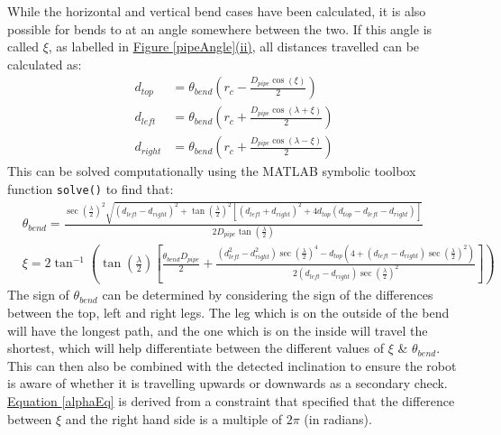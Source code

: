 \documentclass[11pt]{article}		%
\begin{document}
		While the horizontal and vertical bend cases have been calculated, it is also possible for bends to at an angle somewhere between the two.
		If this angle is called $\xi$, as labelled in \hyperref[pipeAngle]{Figure \ref*{pipeAngle}(ii)}, all distances travelled can be calculated as:
		\begin{align}
			d_{top} &= \theta_{bend} \left( r_c - \frac{D_{pipe} \cos \left( \xi \right)}{2} \right) \label{d_top}
			\\
			d_{left} &= \theta_{bend} \left( r_c +  \frac{D_{pipe} \cos \left( \lambda + \xi \right)}{2} \right) \label{d_left}
			\\
			d_{right} &= \theta_{bend} \left( r_c +  \frac{D_{pipe} \cos \left( \lambda - \xi \right)}{2} \right) \label{d_right}
		\end{align}
		This can be solved computationally using the MATLAB symbolic toolbox function \verb|solve()| to find that:	
		\fontsize{10}{\baselineskip}
		\begin{align}
			&\theta_{bend} = \frac{ \sec \left( \frac{\lambda}{2} \right)^2 \sqrt{ \left( d_{left} - d_{right} \right)^2 +  \tan \left( \frac{\lambda}{2} \right)^2 \left[ \left( d_{left} + d_{right} \right)^2 + 4 d_{top} \left( d_{top} - d_{left} - d_{right} \right) \right] } }{2 D_{pipe} \tan \left( \frac{\lambda}{2} \right)} \label{generalTheta}
			\\
			&\xi = 2 \tan^{-1} \left( \tan \left( \frac{\lambda}{2} \right) \left[\frac{ \theta_{bend} D_{pipe}}{2} + \frac{\left( d_{left}^2 - d_{right}^2 \right) \sec \left( \frac{\lambda}{2} \right)^4 - d_{top} \left(4 + \left( d_{left} - d_{right} \right) \sec \left( \frac{\lambda}{2} \right)^2 \right)}{2 \left( d_{left} - d_{right} \right) \sec \left( \frac{\lambda}{2} \right)^2} \right] \right) \label{alphaEq}
		\end{align}
		\fontsize{11}{\baselineskip}
		The sign of $\theta_{bend}$ can be determined by considering the sign of the differences between the top, left and right legs.
		The leg which is on the outside of the bend will have the longest path, and the one which is on the inside will travel the shortest, which will help differentiate between the different values of $\xi$ \& $\theta_{bend}$.
		This can then also be combined with the detected inclination to ensure the robot is aware of whether it is travelling upwards or downwards as a secondary check.
		\\
		\hyperref[alphaEq]{Equation \ref*{alphaEq}} is derived from a constraint that specified that the difference between $\xi$ and the right hand side is a multiple of $2 \pi$ (in radians).
\end{document}

